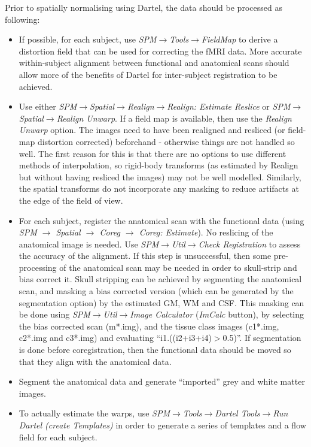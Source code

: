 Prior to spatially normalising using Dartel, the data should be processed as following:
\begin{itemize}
\item{If possible, for each subject, use \emph{SPM$\rightarrow$Tools$\rightarrow$FieldMap} to derive a distortion field that can be used for correcting the fMRI data.
More accurate within-subject alignment between functional and anatomical scans should allow more of the benefits of Dartel for inter-subject registration to be achieved.}
\item{Use either \emph{SPM$\rightarrow$Spatial$\rightarrow$Realign$\rightarrow$Realign: Estimate Reslice} or \emph{SPM$\rightarrow$Spatial$\rightarrow$Realign Unwarp}.  If a field map is available, then use the \emph{Realign Unwarp} option.
The images need to have been realigned and resliced (or field-map distortion corrected) beforehand - otherwise things are not handled so well.  The first reason for this is that there are no options to use different methods of interpolation, so rigid-body transforms (as estimated by Realign but without having resliced the images) may not be well modelled.  Similarly, the spatial transforms do not incorporate any masking to reduce artifacts at the edge of the field of view.}
\item{For each subject, register the anatomical scan with the functional data (using \emph{SPM $\rightarrow$ Spatial $\rightarrow$ Coreg $\rightarrow$ Coreg: Estimate}).  No reslicing of the anatomical image is needed.
Use \emph{SPM$\rightarrow$Util$\rightarrow$Check Registration} to assess the accuracy of the alignment.
If this step is unsuccessful, then some pre-processing of the anatomical scan may be needed in order to skull-strip and bias correct it.
Skull stripping can be achieved by segmenting the anatomical scan, and masking a bias corrected version (which can be generated by the segmentation option) by the estimated GM, WM and CSF.  This masking can be done using \emph{SPM$\rightarrow$Util$\rightarrow$Image Calculator} (\emph{ImCalc} button), by selecting the bias corrected scan (m*.img), and the tissue class images (c1*.img, c2*.img and c3*.img) and evaluating ``i1.\*((i2+i3+i4)$>$0.5)''.
If segmentation is done before coregistration, then the functional data should be moved so that they align with the anatomical data.}
\item{Segment the anatomical data and generate ``imported'' grey and white matter images.}
\item{To actually estimate the warps, use \emph{SPM$\rightarrow$Tools$\rightarrow$Dartel Tools$\rightarrow$Run Dartel (create Templates)} in order to generate a series of templates and a flow field for each subject.}
\end{itemize}

